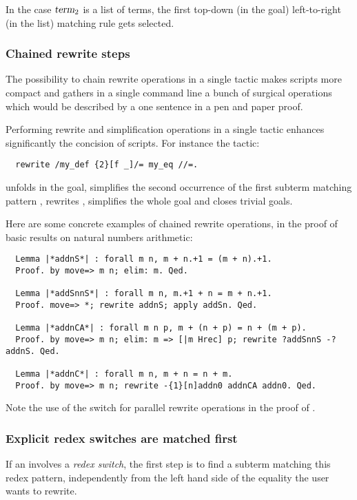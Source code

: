 In the case $\ssrN[2]{term}$ is a list of terms, the first top-down (in
the goal) left-to-right (in the list) matching rule gets selected.

\subsubsection*{Chained rewrite steps}


The possibility to chain rewrite operations in a single tactic makes
scripts more compact and gathers in a single command line a bunch
of surgical
operations  which would be described by a one sentence in a pen and
paper proof.

Performing rewrite and simplification operations in a single tactic
enhances significantly the concision of scripts. For instance the
tactic:
\begin{lstlisting}
  rewrite /my_def {2}[f _]/= my_eq //=.
\end{lstlisting}
unfolds  in the goal, simplifies the second occurrence of the
first subterm matching pattern \ssrC{[f _]}, rewrites ,
simplifies the whole goal and closes trivial goals.

Here are some concrete examples of chained rewrite operations, in the
proof of basic results on natural numbers arithmetic:

\begin{lstlisting}
  Lemma |*addnS*| : forall m n, m + n.+1 = (m + n).+1.
  Proof. by move=> m n; elim: m. Qed.

  Lemma |*addSnnS*| : forall m n, m.+1 + n = m + n.+1.
  Proof. move=> *; rewrite addnS; apply addSn. Qed.

  Lemma |*addnCA*| : forall m n p, m + (n + p) = n + (m + p).
  Proof. by move=> m n; elim: m => [|m Hrec] p; rewrite ?addSnnS -?addnS. Qed.

  Lemma |*addnC*| : forall m n, m + n = n + m.
  Proof. by move=> m n; rewrite -{1}[n]addn0 addnCA addn0. Qed.
\end{lstlisting}

Note the use of the  switch for parallel rewrite operations in
the proof of .

\subsubsection*{Explicit redex switches are matched first}
If an  involves a \emph{redex switch}, the first step is to
find a subterm matching this redex pattern, independently from the left hand
side  of the equality the user wants to rewrite.

